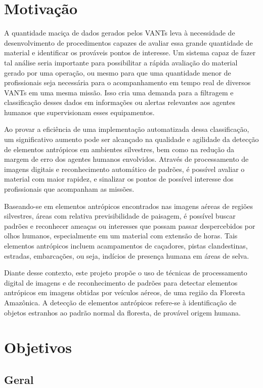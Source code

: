 \section{Motivação}

A quantidade maciça de dados gerados pelos VANTs leva à necessidade de desenvolvimento de procedimentos capazes de avaliar essa grande quantidade de material e identificar os prováveis pontos de interesse. Um sistema capaz de fazer tal análise seria importante para possibilitar a rápida avaliação do material gerado por uma operação, ou mesmo para que uma quantidade menor de profissionais seja necessária para o acompanhamento em tempo real de diversos VANTs em uma mesma missão. Isso cria uma demanda para a filtragem e classificação desses dados em informações ou alertas relevantes aos agentes humanos que supervisionam esses equipamentos.

Ao provar a eficiência de uma implementação automatizada dessa classificação, um significativo aumento pode ser alcançado na qualidade e agilidade da detecção de elementos antrópicos em ambientes silvestres, bem como na redução da margem de erro dos agentes humanos envolvidos. Através de processamento de imagens digitais e reconhecimento automático de padrões, é possível avaliar o material com maior rapidez, e sinalizar os pontos de possível interesse dos profissionais que acompanham as missões.

Baseando-se em elementos antrópicos encontrados nas imagens aéreas de regiões silvestres, áreas com relativa previsibilidade de paisagem, é possível buscar padrões e reconhecer ameaças ou interesses que possam passar despercebidos por olhos humanos, especialmente em um material com extensão de horas. Tais elementos antrópicos incluem acampamentos de caçadores, pistas clandestinas, estradas, embarcações, ou seja, indícios de presença humana em áreas de selva.

Diante desse contexto, este projeto propõe o uso de técnicas de processamento digital de imagens e de reconhecimento de padrões para detectar elementos antrópicos em imagens obtidas por veículos aéreos, de uma região da Floresta Amazônica. A detecção de elementos antrópicos refere-se à identificação de objetos estranhos ao padrão normal da floresta, de provável origem humana.

\section{Objetivos}

\subsection{Geral}

